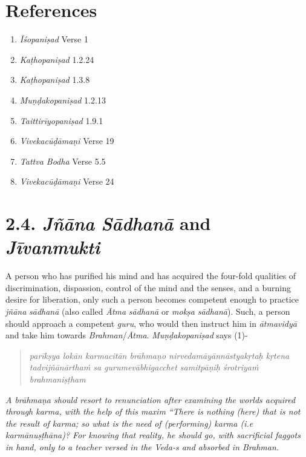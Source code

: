 \section*{References}

\begin{enumerate}
\itemsep=0pt
\item
  \emph{Īśopaniṣad} Verse 1
\item
  \emph{Kaṭhopaniṣad} 1.2.24
\item
  \emph{Kaṭhopaniṣad} 1.3.8
\item
  \emph{Muṇḍakopaniṣad} 1.2.13
\item
  \emph{Taittirīyopaniṣad} 1.9.1
\item
  \emph{Vivekacūḍāmaṇi} Verse 19
\item
  \emph{Tattva Bodha} Verse 5.5
\item
  \emph{Vivekacūḍāmaṇi} Verse 24
\end{enumerate}

\section*{2.4. \emph{Jñāna} \emph{Sādhanā} and \emph{Jīvanmukti}}

A person who has purified his mind and has acquired the four-fold qualities of discrimination, dispassion, control of the mind and the senses, and a burning desire for liberation, only such a person becomes competent enough to practice \emph{jñāna} \emph{sādhanā} (also called \emph{Ātma} \emph{sādhanā} or \emph{mokṣa} \emph{sādhanā}). Such, a person should approach a competent \emph{guru}, who would then instruct him in \emph{ātmavidyā} and take him towards \emph{Brahman}/\emph{Ātma}. \emph{Muṇḍakopaniṣad} says (1)-

\begin{verse}
\emph{parīkṣya lokān karmacitān brāhmaṇo nirvedamāyānnāstyakṛtaḥ kṛtena }\\
\emph{tadvijñānārthaṁ sa gurumevābhigacchet samitpāṇiḥ śrotriyaṁ brahmaniṣṭham }
\end{verse}

\emph{A brāhmaṇa should resort to renunciation after examining the worlds acquired through karma, with the help of this maxim ``There is nothing (here) that is not the result of karma; so what is the need of (performing) karma (i.e karmānuṣṭhāna)? For knowing that reality, he should go, with sacrificial faggots in hand, only to a teacher versed in the Veda-s and absorbed in Brahman.}

